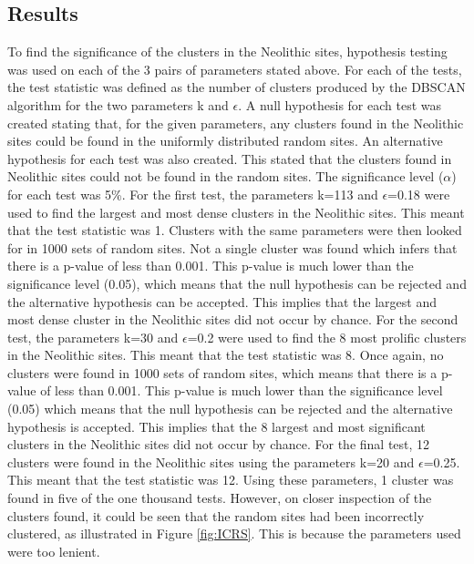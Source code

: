 \documentclass[a4paper]{article}
\begin{document}
\subsection{Results}
To find the significance of the clusters in the Neolithic sites, hypothesis testing was used on each of the 3 pairs of parameters stated above. For each of the tests, the test statistic was defined as the number of clusters produced by the DBSCAN algorithm for the two parameters k and $\epsilon$. A null hypothesis for each test was created stating that, for the given parameters, any clusters found in the Neolithic sites could be found in the uniformly distributed random sites. An alternative hypothesis for each test was also created. This stated that the clusters found in Neolithic sites could not be found in the random sites. The significance level ($\alpha$) for each test was 5\%.
\newline \newline
For the first test, the parameters k=113 and $\epsilon$=0.18 were used to find the largest and most dense clusters in the Neolithic sites. This meant that the test statistic was 1. Clusters with the same parameters were then looked for in 1000 sets of random sites. Not a single cluster was found which infers that there is a p-value of less than 0.001. This p-value is much lower than the significance level (0.05), which means that the null hypothesis can be rejected and the alternative hypothesis can be accepted. This implies that the largest and most dense cluster in the Neolithic sites did not occur by chance.
\newline \newline
For the second test, the parameters k=30 and $\epsilon$=0.2 were used to find the 8 most prolific clusters in the Neolithic sites. This meant that the test statistic was 8. Once again, no clusters were found in 1000 sets of random sites, which means that there is a p-value of less than 0.001. This p-value is much lower than the significance level (0.05) which means that the null hypothesis can be rejected and the alternative hypothesis is accepted. This implies that the 8 largest and most significant clusters in the Neolithic sites did not occur by chance.
\newline \newline
For the final test, 12 clusters were found in the Neolithic sites using the parameters k=20 and $\epsilon$=0.25. This meant that the test statistic was 12. Using these parameters, 1 cluster was found in five of the one thousand tests. However, on closer inspection of the clusters found, it could be seen that the random sites had been incorrectly clustered, as illustrated in Figure \ref{fig:ICRS}. This is because the parameters used were too lenient. 
\end{document}

